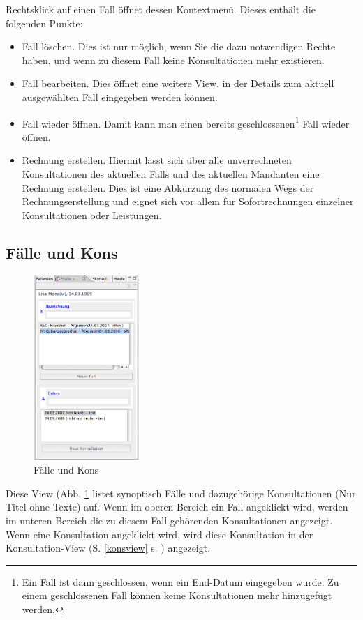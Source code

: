 Rechtsklick auf einen Fall öffnet dessen Kontextmenü. Dieses enthält die
folgenden Punkte:
\begin{itemize}
  \item {Fall löschen}. Dies ist nur möglich, wenn Sie die dazu notwendigen Rechte
  haben, und wenn zu diesem Fall keine Konsultationen mehr existieren.
  \item {Fall bearbeiten}. Dies öffnet eine weitere View, in der Details zum
  aktuell ausgewählten Fall eingegeben werden können.
  \item {Fall wieder öffnen}. Damit kann man einen bereits
  geschlossenen\footnote{Ein Fall ist dann geschlossen, wenn ein End-Datum
  eingegeben wurde. Zu einem geschlossenen Fall können keine Konsultationen mehr
  hinzugefügt werden.} Fall wieder öffnen.
  \item {Rechnung erstellen}. Hiermit lässt sich über alle unverrechneten
  Konsultationen des aktuellen Falls und des aktuellen Mandanten eine Rechnung
  erstellen. Dies ist eine \glqq Abkürzung\grqq{} des normalen Wegs der
  Rechnungserstellung und eignet sich vor allem für Sofortrechnungen einzelner
  Konsultationen oder Leistungen.
\end{itemize}
\subsection{Fälle und Kons}
\begin{figure}
  \includegraphics[width=4cm]{images/fallkonsview}
  \caption{Fälle und Kons}
  \label{fig:fallkons}
\end{figure}
Diese View (Abb. \ref{fig:fallkons} listet synoptisch Fälle und dazugehörige
Konsultationen (Nur Titel ohne Texte) auf. Wenn im oberen Bereich ein Fall
angeklickt wird, werden im unteren Bereich die zu diesem Fall gehörenden
Konsultationen angezeigt. Wenn eine Konsultation angeklickt wird, wird diese
Konsultation in der Konsultation-View (S. \ref{konsview} s. \pageref{konsview}) angezeigt.\\

